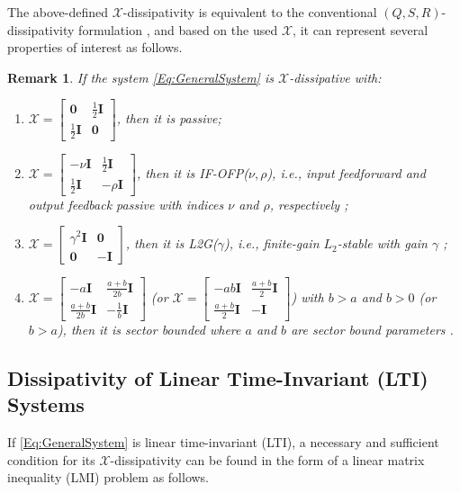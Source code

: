 \documentclass[letterpaper, 10 pt, conference]{ieeeconf}%
\newcommand{\I}{\mathbf{I}}
\newcommand{\0}{\mathbf{0}}
\newcommand{\X}{\mathcal{X}}
\newcommand{\bm}[1]{\begin{bmatrix}#1\end{bmatrix}}
\newtheorem{remark}{\textbf{Remark}}
\begin{document}
The above-defined $\X$-dissipativity is equivalent to the conventional $(Q,S,R)$-dissipativity formulation \cite{Kottenstette2014}, and based on the used $\X$, it can represent several properties of interest as follows. 

\begin{remark}\label{Rm:X-DissipativityVersions}
If the system \eqref{Eq:GeneralSystem} is $\X$-dissipative with:  
\begin{enumerate}
\item $\X = \bm{\0 & \frac{1}{2}\I \\ \frac{1}{2}\I & \0}$, then it is \emph{passive};
\item $\X = \bm{-\nu\I & \frac{1}{2}\I \\ \frac{1}{2}\I & -\rho\I}$, then it is IF-OFP($\nu,\rho$), i.e., input feedforward and output feedback passive with indices $\nu$ and $\rho$, respectively \cite{WelikalaP42022};
\item $\X = \bm{\gamma^2\I & \0 \\ \0 & -\I}$, then it is L2G($\gamma$), i.e., finite-gain \emph{$L_2$-stable} with gain $\gamma$ \cite{WelikalaP42022};
\item $\X = \bm{-a\I & \frac{a+b}{2b}\I \\ \frac{a+b}{2b}\I & -\frac{1}{b}\I}$ (or $\X = \bm{-ab\I & \frac{a+b}{2}\I \\ \frac{a+b}{2}\I & -\I}$)  with $b>a$ and $b>0$ (or $b>a$), then it is sector bounded where $a$ and $b$ are sector bound parameters \cite{Kottenstette2014}.
\end{enumerate}  
\end{remark}



\subsection{Dissipativity of Linear Time-Invariant (LTI) Systems}\label{SubSec:dissipativity_LTI_systems}

If \eqref{Eq:GeneralSystem} is linear time-invariant (LTI), a necessary and sufficient condition for its $\X$-dissipativity can be found in the form of a linear matrix inequality (LMI) problem as follows.
\end{document}
